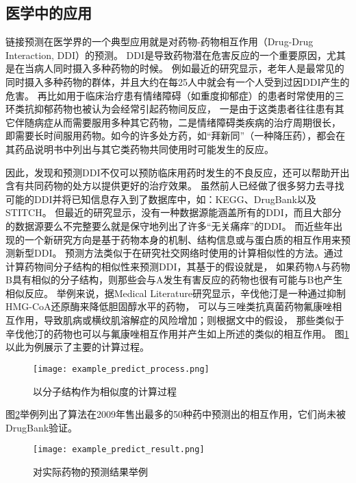 \subsection{医学中的应用}
链接预测在医学界的一个典型应用就是对药物-药物相互作用（Drug-Drug Interaction, DDI）的预测。
DDI是导致药物潜在危害反应的一个重要原因，尤其是在当病人同时摄入多种药物的时候\cite{fokoue2016predicting}。
例如最近的研究显示，老年人是最常见的同时摄入多种药物的群体，并且大约在每25人中就会有一个人受到过因DDI产生的危害\cite{huang2013systematic}\cite{juurlink2003drug}。
再比如用于临床治疗患有情绪障碍（如重度抑郁症）的患者时常使用的三环类抗抑郁药物也被认为会经常引起药物间反应，
一是由于这类患者往往患有其它伴随病症从而需要服用多种其它药物，二是情绪障碍类疾病的治疗周期很长，
即需要长时间服用药物。如今的许多处方药，如“拜新同”（一种降压药），都会在其药品说明书中列出与其它类药物共同使用时可能发生的反应。

因此，发现和预测DDI不仅可以预防临床用药时发生的不良反应，还可以帮助开出含有共同药物的处方以提供更好的治疗效果\cite{zhang2018prioritizing}。
虽然前人已经做了很多努力去寻找可能的DDI并将已知信息存入到了数据库中，如：KEGG、DrugBank以及STITCH。
但最近的研究显示，没有一种数据源能涵盖所有的DDI，而且大部分的数据源要么不完整要么就是保守地列出了许多“无关痛痒”的DDI\cite{fokoue2016predicting}。
而近些年出现的一个新研究方向是基于药物本身的机制、结构信息或与蛋白质的相互作用来预测新型DDI。
预测方法类似于在研究社交网络时使用的计算相似性的方法。\cite{vilar2012drug}通过计算药物间分子结构的相似性来预测DDI，其基于的假设就是，
如果药物A与药物B具有相似的分子结构，则那些会与A发生有害反应的药物也很有可能与B也产生相似反应。
举例来说，据Medical Literature研究显示，辛伐他汀是一种通过抑制HMG-CoA还原酶来降低胆固醇水平的药物，
可以与三唑类抗真菌药物氟康唑相互作用，导致肌病或横纹肌溶解症的风险增加；则根据文中的假设，
那些类似于辛伐他汀的药物也可以与氟康唑相互作用并产生如上所述的类似的相互作用。
图\ref{intro:fig:process}以此为例展示了主要的计算过程。
\begin{figure} 
  \centering
  \texttt{[image: example\_predict\_process.png]}
  \caption{以分子结构作为相似度的计算过程\cite{vilar2012drug}}
  \label{intro:fig:process}
\end{figure} 
图\ref{intro:fig:result}举例列出了算法在2009年售出最多的50种药中预测出的相互作用，它们尚未被DrugBank验证。
\begin{figure} 
  \centering
  \texttt{[image: example\_predict\_result.png]}
  \caption{对实际药物的预测结果举例\cite{vilar2012drug}}
  \label{intro:fig:result}
\end{figure} 

